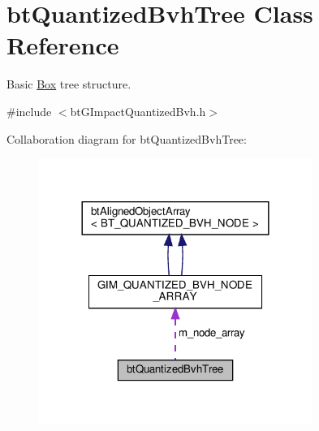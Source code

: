 \hypertarget{classbtQuantizedBvhTree}{}\section{bt\+Quantized\+Bvh\+Tree Class Reference}
\label{classbtQuantizedBvhTree}


Basic \hyperlink{classBox}{Box} tree structure.  




{\ttfamily \#include $<$bt\+G\+Impact\+Quantized\+Bvh.\+h$>$}



Collaboration diagram for bt\+Quantized\+Bvh\+Tree\+:
\nopagebreak
\begin{figure}[H]
\begin{center}
\leavevmode
\includegraphics[width=252pt]{classbtQuantizedBvhTree__coll__graph}
\end{center}
\end{figure}
